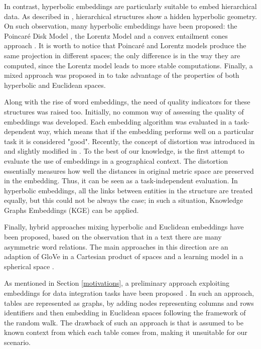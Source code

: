 In contrast, hyperbolic embeddings are particularly suitable to embed hierarchical data. 
As described in \cite{krioukov2010hyperbolic}, hierarchical structures show a hidden hyperbolic geometry. 
On such observation, many hyperbolic embeddings have been proposed: the Poincar\'e Disk Model \cite{NIPS2017_7213}, the Lorentz Model \cite{DBLP:journals/corr/abs-1806-03417} and a convex entailment cones approach \cite{ganea2018hyperbolic}. 
It is worth to notice that Poincar\'e and Lorentz models produce the same projection in different spaces; the only difference is in the way they are computed, since the Lorentz model leads to more stable computations. 
Finally, a mixed approach was proposed in \cite{gu2018learning} to take advantage of the properties of both hyperbolic and Euclidean spaces. 

Along with the rise of word embeddings, the need of quality indicators for these structures was raised too. 
Initially, no common way of assessing the quality of embeddings was developed. 
Each embedding algorithm was evaluated in a task-dependent way, which means that if the embedding performs well on a particular task it is considered "good". 
Recently, the concept of distortion was introduced in \cite{sala2018representation} and slightly modified in \cite{dassereto2019evaluating}. 
To the best of our knowledge, \cite{dassereto2019evaluating} is the first attempt to evaluate the use of embeddings in a geographical context. 
The distortion essentially measures how well the distances in original metric space are preserved in the embedding. Thus, it can be seen as a task-independent evaluation. In hyperbolic embeddings, all the links between entities in the structure are treated equally, but this could not be always the case; in such a situation, Knowledge Graphs Embeddings (KGE) can be applied. 

Finally, hybrid approaches mixing hyperbolic and Euclidean embeddings have been proposed, based on the observation that in a text there are many asymmetric word relations. The main approaches in this direction are an adaption of GloVe in a Cartesian product of spaces \cite{tifrea2018poincare} and a learning model in a spherical space \cite{meng2019spherical}.  

As mentioned in Section \ref{motivations}, a preliminary approach exploiting embeddings for data integration tasks have been proposed \cite{cappuzzo2020creating}. In such an approach, tables are represented as graphs, by adding nodes representing columns and rows identifiers and then embedding in Euclidean spaces following the framework of the random walk. The drawback of such an approach is that is assumed to be known context from which each table comes from, making it unsuitable for our scenario.

